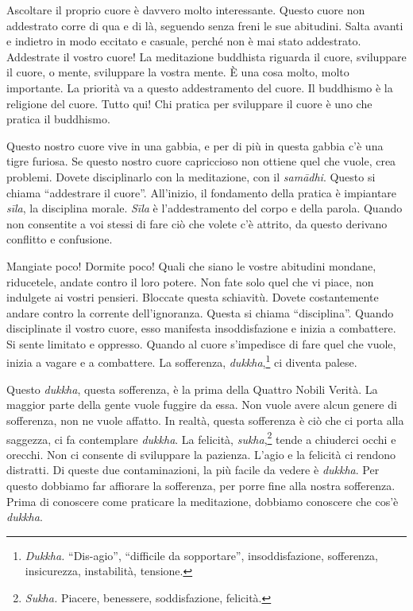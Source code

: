 Ascoltare il proprio cuore è davvero molto interessante. Questo cuore
non addestrato corre di qua e di là, seguendo senza freni le sue
abitudini. Salta avanti e indietro in modo eccitato e casuale, perché
non è mai stato addestrato. Addestrate il vostro cuore! La meditazione
buddhista riguarda il cuore, sviluppare il cuore, o mente, sviluppare la
vostra mente. È una cosa molto, molto importante. La priorità va a
questo addestramento del cuore. Il buddhismo è la religione del cuore.
Tutto qui! Chi pratica per sviluppare il cuore è uno che pratica il
buddhismo.

Questo nostro cuore vive in una gabbia, e per di più in questa gabbia
c'è una tigre furiosa. Se questo nostro cuore capriccioso non ottiene
quel che vuole, crea problemi. Dovete disciplinarlo con la meditazione,
con il \emph{samādhi}. Questo si chiama ``addestrare il cuore''.
All'inizio, il fondamento della pratica è impiantare \emph{sīla}, la
disciplina morale. \emph{Sīla} è l'addestramento del corpo e della
parola. Quando non consentite a voi stessi di fare ciò che volete c'è
attrito, da questo derivano conflitto e confusione.

Mangiate poco! Dormite poco! Quali che siano le vostre abitudini
mondane, riducetele, andate contro il loro potere. Non fate solo quel
che vi piace, non indulgete ai vostri pensieri. Bloccate questa
schiavitù. Dovete costantemente andare contro la corrente
dell'ignoranza. Questa si chiama ``disciplina''. Quando disciplinate il
vostro cuore, esso manifesta insoddisfazione e inizia a combattere. Si
sente limitato e oppresso. Quando al cuore s'impedisce di fare quel che
vuole, inizia a vagare e a combattere. La sofferenza,
\emph{dukkha},\footnote{\emph{Dukkha.} ``Dis-agio'', ``difficile da
  sopportare'', insoddisfazione, sofferenza, insicurezza, instabilità,
  tensione.} ci diventa palese.

Questo \emph{dukkha}, questa sofferenza, è la prima della Quattro Nobili
Verità. La maggior parte della gente vuole fuggire da essa. Non vuole
avere alcun genere di sofferenza, non ne vuole affatto. In realtà,
questa sofferenza è ciò che ci porta alla saggezza, ci fa contemplare
\emph{dukkha}. La felicità, \emph{sukha},\footnote{\emph{Sukha.}
  Piacere, benessere, soddisfazione, felicità.} tende a chiuderci occhi
e orecchi. Non ci consente di sviluppare la pazienza. L'agio e la
felicità ci rendono distratti. Di queste due contaminazioni, la più
facile da vedere è \emph{dukkha}. Per questo dobbiamo far affiorare la
sofferenza, per porre fine alla nostra sofferenza. Prima di conoscere
come praticare la meditazione, dobbiamo conoscere che cos'è
\emph{dukkha}.

